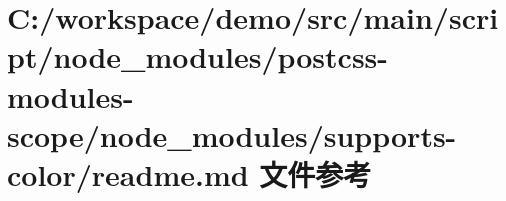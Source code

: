 \hypertarget{node__modules_2postcss-modules-scope_2node__modules_2supports-color_2_r_e_a_d_m_e_8md}{}\section{C\+:/workspace/demo/src/main/script/node\+\_\+modules/postcss-\/modules-\/scope/node\+\_\+modules/supports-\/color/readme.md 文件参考}
\label{node__modules_2postcss-modules-scope_2node__modules_2supports-color_2_r_e_a_d_m_e_8md}
